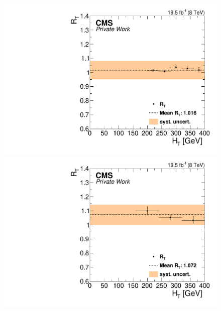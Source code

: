 \begin{figure}[htbp]
\centering
\begin{minipage}[t]{0.49\textwidth}
  \includegraphics[width=\textwidth]{plots/BG/trigger/Triggereff_SFvsOF_Syst_AlphaT_HighHTExclusiveCentral_Full2012_HT_None.pdf}
\end{minipage}
\begin{minipage}[t]{0.49\textwidth}
\includegraphics[width=\textwidth]{plots/BG/trigger/Triggereff_SFvsOF_Syst_AlphaT_HighHTExclusiveForward_Full2012_HT_None.pdf}
\end{minipage}
\begin{minipage}[t]{0.49\textwidth}

\end{minipage}
\end{figure}
